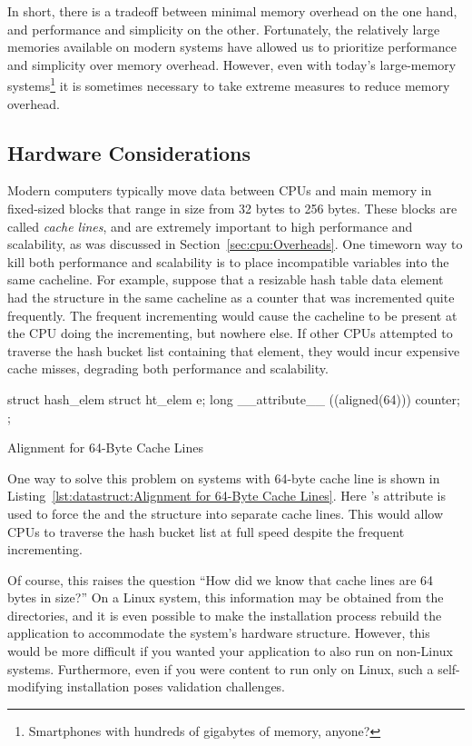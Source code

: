 In short, there is a tradeoff between minimal memory overhead on
the one hand, and performance and simplicity on the other.
Fortunately, the relatively large memories available on modern
systems have allowed us to prioritize performance and simplicity
over memory overhead.
However, even with today's large-memory systems\footnote{
	Smartphones with hundreds of gigabytes of memory, anyone?}
it is sometimes necessary to take extreme measures to reduce
memory overhead.

\subsection{Hardware Considerations}
\label{sec:datastruct:Hardware Considerations}

Modern computers typically move data between CPUs and main memory in
fixed-sized blocks that range in size from 32 bytes to 256 bytes.
These blocks are called \emph{cache lines}, and are extremely important
to high performance and scalability, as was discussed in
Section~\ref{sec:cpu:Overheads}.
One timeworn way to kill both performance and scalability is to
place incompatible variables into the same cacheline.
For example, suppose that a resizable hash table data element had
the  structure in the same cacheline as a counter that
was incremented quite frequently.
The frequent incrementing would cause the cacheline to be present at
the CPU doing the incrementing, but nowhere else.
If other CPUs attempted to traverse the hash bucket list containing
that element, they would incur expensive cache misses, degrading both
performance and scalability.

\begin{listing}[tb]
\begin{VerbatimL}
struct hash_elem {
	struct ht_elem e;
	long __attribute__ ((aligned(64))) counter;
};
\end{VerbatimL}
\caption{Alignment for 64-Byte Cache Lines}
\label{lst:datastruct:Alignment for 64-Byte Cache Lines}
\end{listing}

One way to solve this problem on systems with 64-byte cache line is shown in
Listing~\ref{lst:datastruct:Alignment for 64-Byte Cache Lines}.
Here \GCC's  attribute is used to force the 
and the  structure into separate cache lines.
This would allow CPUs to traverse the hash bucket list at full speed
despite the frequent incrementing.

Of course, this raises the question ``How did we know that cache lines
are 64 bytes in size?''
On a Linux system, this information may be obtained from the
 directories, and it is even
possible to make the installation process rebuild the application to
accommodate the system's hardware structure.
However, this would be more difficult if you wanted your application to
also run on non-Linux systems.
Furthermore, even if you were content to run only on Linux, such a
self-modifying installation poses validation challenges.

